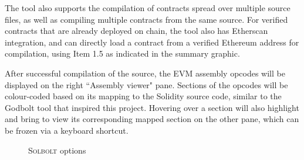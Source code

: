 The tool also supports the compilation of contracts spread over multiple source files,
as well as compiling multiple contracts from the same source. For verified contracts that
are already deployed on chain, the tool also has Etherscan integration, and can directly
load a contract from a verified Ethereum address for compilation, using Item 1.5 
as indicated in the summary graphic.

After successful compilation of the source, the EVM assembly opcodes will be displayed
on the right ``Assembly viewer" pane. Sections of the opcodes will be colour-coded based 
on its mapping to the Solidity source code, similar to the Godbolt tool that inspired this
project. Hovering over a section will also highlight and bring to view its corresponding
mapped section on the other pane, which can be frozen via a keyboard shortcut.

\begin{figure}[h]
  \centering
  \qquad
  \caption{\textcolor{NavyBlue}{\textsc{Solbolt}} options}%
  \label{fig:solbolt_options}%
\end{figure}



